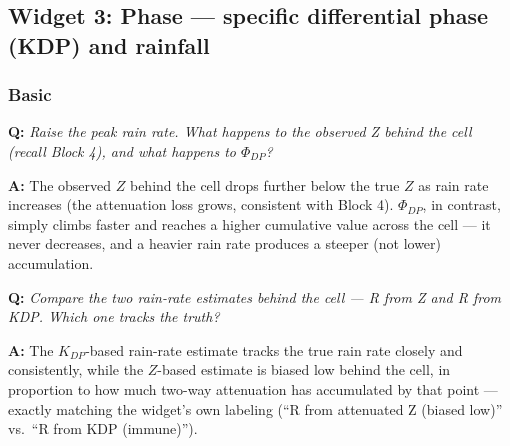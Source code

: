 \documentclass[11pt]{article}
\newenvironment{qa}[1]{\par\noindent\textbf{\color{qgray}Q: }\emph{#1}\par\noindent\textbf{A: }}{\par\vspace{6pt}}
\newcommand{\tier}[1]{\subsubsection*{#1}}
\begin{document}
\subsection{Widget 3: Phase --- specific differential phase (KDP) and rainfall}

\tier{Basic}
\begin{qa}{Raise the peak rain rate. What happens to the observed Z behind the cell (recall Block 4), and what happens to $\Phi_{DP}$?}
The observed $Z$ behind the cell drops further below the true $Z$ as rain rate increases (the attenuation loss grows, consistent with Block 4). $\Phi_{DP}$, in contrast, simply climbs faster and reaches a higher cumulative value across the cell --- it never decreases, and a heavier rain rate produces a steeper (not lower) accumulation.
\end{qa}
\begin{qa}{Compare the two rain-rate estimates behind the cell --- R from Z and R from KDP. Which one tracks the truth?}
The $K_{DP}$-based rain-rate estimate tracks the true rain rate closely and consistently, while the $Z$-based estimate is biased low behind the cell, in proportion to how much two-way attenuation has accumulated by that point --- exactly matching the widget's own labeling (``R from attenuated Z (biased low)'' vs.\ ``R from KDP (immune)'').
\end{qa}
\end{document}
